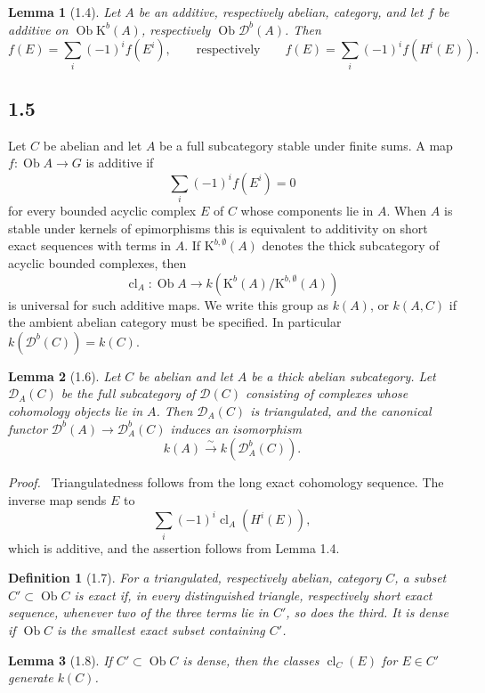 \documentclass[11pt]{article}
\theoremstyle{plain}
\newtheorem*{lemma*}{Lemma}
\newtheorem*{definition*}{Definition}
\theoremstyle{definition}
\theoremstyle{remark}
\newenvironment{prooftext}{\par\noindent\textit{Proof.}\ }{\par\medskip}
\newcommand{\D}{\mathcal D}\newcommand{\E}{\mathcal E}\newcommand{\F}{\mathcal F}
\DeclareMathOperator{\ob}{Ob}
\DeclareMathOperator{\cl}{cl}
\providecommand{\K}{\mathrm K}
\providecommand{\iso}{\xrightarrow{\sim}}
\begin{document}
\begin{lemma*}[1.4]
Let $A$ be an additive, respectively abelian, category, and let $f$ be additive on $\ob\K^b(A)$, respectively $\ob\D^b(A)$. Then
\[
f(E)=\sum_i(-1)^if(E^i),
\qquad
\text{respectively}\qquad
f(E)=\sum_i(-1)^if(H^i(E)).
\]
\end{lemma*}

\subsection*{1.5}
Let $C$ be abelian and let $A$ be a full subcategory stable under finite sums. A map $f:\ob A\to G$ is additive if
\[
\sum_i(-1)^if(E^i)=0
\]
for every bounded acyclic complex $E$ of $C$ whose components lie in $A$. When $A$ is stable under kernels of epimorphisms this is equivalent to additivity on short exact sequences with terms in $A$. If $\K^{b,\emptyset}(A)$ denotes the thick subcategory of acyclic bounded complexes, then
\[
\cl_A:\ob A\to k(\K^b(A)/\K^{b,\emptyset}(A))
\]
is universal for such additive maps. We write this group as $k(A)$, or $k(A,C)$ if the ambient abelian category must be specified. In particular $k(\D^b(C))=k(C)$.

\begin{lemma*}[1.6]
Let $C$ be abelian and let $A$ be a thick abelian subcategory. Let $\D_A(C)$ be the full subcategory of $\D(C)$ consisting of complexes whose cohomology objects lie in $A$. Then $\D_A(C)$ is triangulated, and the canonical functor $\D^b(A)\to\D_A^b(C)$ induces an isomorphism
\[
k(A)\iso k(\D_A^b(C)).
\]
\end{lemma*}

\begin{prooftext}
Triangulatedness follows from the long exact cohomology sequence. The inverse map sends $E$ to
\[
\sum_i(-1)^i\cl_A(H^i(E)),
\]
which is additive, and the assertion follows from Lemma 1.4.
\end{prooftext}

\begin{definition*}[1.7]
For a triangulated, respectively abelian, category $C$, a subset $C'\subset\ob C$ is exact if, in every distinguished triangle, respectively short exact sequence, whenever two of the three terms lie in $C'$, so does the third. It is dense if $\ob C$ is the smallest exact subset containing $C'$.
\end{definition*}

\begin{lemma*}[1.8]
If $C'\subset\ob C$ is dense, then the classes $\cl_C(E)$ for $E\in C'$ generate $k(C)$.
\end{lemma*}
\end{document}
